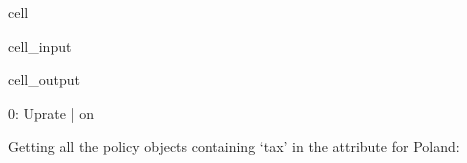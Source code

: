 \documentclass[letterpaper,10pt,english]{sphinxmanual}
\begin{document}
\begin{sphinxuseclass}{cell}
\begin{sphinxuseclass}{cell_input}
\begin{sphinxVerbatim}[commandchars=\\\{\}]
\PYG{p}{[}\PYG{p}{]}\PYG{p}{[}\PYG{p}{]}\PYG{p}{[}\PYG{p}{]}
\end{sphinxVerbatim}

\end{sphinxuseclass}
\begin{sphinxuseclass}{cell_output}
\begin{sphinxVerbatim}[commandchars=\\\{\}]
0: Uprate     | on  
\end{sphinxVerbatim}

\end{sphinxuseclass}
\end{sphinxuseclass}
\sphinxAtStartPar
Getting all the policy objects containing ‘tax’ in the  attribute for Poland:
\end{document}
